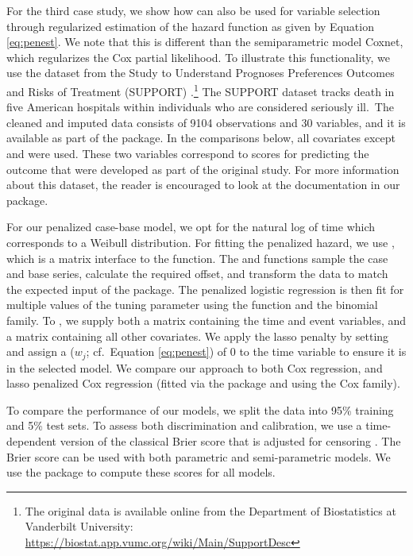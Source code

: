 For the third case study, we show how  can also be used
for variable selection through regularized estimation of the hazard
function as given by Equation \ref{eq:penest}. We note that this is
different than the semiparametric model Coxnet, which regularizes the
Cox partial likelihood. To illustrate this functionality, we use the
dataset from the Study to Understand Prognoses Preferences Outcomes and
Risks of Treatment (SUPPORT)
\citep{knaus1995support}.\footnote{The original data is available online from the Department of Biostatistics at Vanderbilt University: \url{https://biostat.app.vumc.org/wiki/Main/SupportDesc}}
The SUPPORT dataset tracks death in five American hospitals within
individuals who are considered seriously ill.~The cleaned and imputed
data consists of 9104 observations and 30 variables, and it is available
as part of the  package. In the comparisons below, all
covariates except  and  were used. These two
variables correspond to scores for predicting the outcome that were
developed as part of the original study. For more information about this
dataset, the reader is encouraged to look at the documentation in our
package.

For our penalized case-base model, we opt for the natural log of time
which corresponds to a Weibull distribution. For fitting the penalized
hazard, we use , which is a matrix interface
to the  function. The  and
 functions sample the case and base series,
calculate the required offset, and transform the data to match the
expected input of the  package. The penalized logistic
regression is then fit for multiple values of the tuning parameter using
the function  and the binomial family. To
, we supply both a matrix  containing
the time and event variables, and a matrix  containing all other
covariates. We apply the lasso penalty by setting  and
assign a  (\(w_j\); cf.~Equation \ref{eq:penest})
of 0 to the time variable to ensure it is in the selected model. We
compare our approach to both Cox regression, and lasso penalized Cox
regression (fitted via the  package and using the Cox
family).

To compare the performance of our models, we split the data into 95\%
training and 5\% test sets. To assess both discrimination and
calibration, we use a time-dependent version of the classical Brier
score that is adjusted for censoring \citep{graf1999ass}. The Brier
score can be used with both parametric and semi-parametric models. We
use the  package to compute these scores for all
models.

